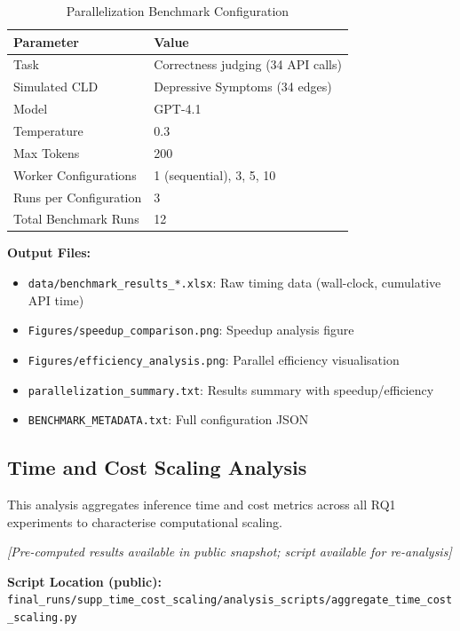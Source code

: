 \begin{table}[H]
\centering
\caption{Parallelization Benchmark Configuration}
\label{tab:parallel_benchmark_config}
\footnotesize
\begin{tabular}{@{}ll@{}}
\toprule
\textbf{Parameter} & \textbf{Value} \\
\midrule
Task & Correctness judging (34 API calls) \\
Simulated CLD & Depressive Symptoms (34 edges) \\
Model & GPT-4.1 \\
Temperature & 0.3 \\
Max Tokens & 200 \\
Worker Configurations & 1 (sequential), 3, 5, 10 \\
Runs per Configuration & 3 \\
Total Benchmark Runs & 12 \\
\bottomrule
\end{tabular}
\end{table}

\textbf{Output Files:}
\begin{itemize}[noitemsep]
    \item \texttt{data/benchmark\_results\_*.xlsx}: Raw timing data (wall-clock, cumulative API time)
    \item \texttt{Figures/speedup\_comparison.png}: Speedup analysis figure
    \item \texttt{Figures/efficiency\_analysis.png}: Parallel efficiency visualisation
    \item \texttt{parallelization\_summary.txt}: Results summary with speedup/efficiency
    \item \texttt{BENCHMARK\_METADATA.txt}: Full configuration JSON
\end{itemize}

\subsection{Time and Cost Scaling Analysis}
\label{sec:time_cost_scaling}

This analysis aggregates inference time and cost metrics across all RQ1 experiments to characterise computational scaling.

\noindent\textit{[Pre-computed results available in public snapshot; script available for re-analysis]}

\textbf{Script Location (public):} \texttt{final\_runs/supp\_time\_cost\_scaling/analysis\_scripts/aggregate\_time\_cost\_scaling.py}

